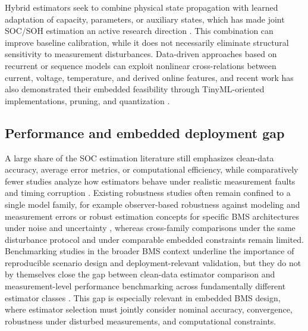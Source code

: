 \documentclass[review]{elsarticle}
\begin{document}
Hybrid estimators seek to combine physical state propagation with learned adaptation of capacity, parameters, or auxiliary states, which has made joint SOC/SOH estimation an active research direction \cite{gaoCoEstimationStateofChargeStateof2022,shenAlternativeCombinedCoestimation2022,wangFusionEstimationLithiumion2022}. This combination can improve baseline calibration, while it does not necessarily eliminate structural sensitivity to measurement disturbances. Data-driven approaches based on recurrent or sequence models can exploit nonlinear cross-relations between current, voltage, temperature, and derived online features, and recent work has also demonstrated their embedded feasibility through TinyML-oriented implementations, pruning, and quantization \cite{mondalEstimatingStateofChargeLithiumIon2024,Embedded_AI_only_SOC_mobile,giazitzisCaseStudyTiny2024,mazziStateChargeEstimation2022,yaoSmarterBatteryManagement2025b}.

\subsection{Performance and embedded deployment gap}
A large share of the SOC estimation literature still emphasizes clean-data accuracy, average error metrics, or computational efficiency, while comparatively fewer studies analyze how estimators behave under realistic measurement faults and timing corruption \cite{shrivastavaReviewTechnologicalAdvancement2023,Embedded_AI_only_SOC_mobile,giazitzisCaseStudyTiny2024,mazziStateChargeEstimation2022}. Existing robustness studies often remain confined to a single model family, for example observer-based robustness against modeling and measurement errors \cite{liRobustnessSOCEstimation2015} or robust estimation concepts for specific BMS architectures under noise and uncertainty \cite{naseriReliableWirelessBMS2025}, whereas cross-family comparisons under the same disturbance protocol and under comparable embedded constraints remain limited. Benchmarking studies in the broader BMS context underline the importance of reproducible scenario design and deployment-relevant validation, but they do not by themselves close the gap between clean-data estimator comparison and measurement-level performance benchmarking across fundamentally different estimator classes \cite{bergerBenchmarkingBatteryManagement2024}. This gap is especially relevant in embedded BMS design, where estimator selection must jointly consider nominal accuracy, convergence, robustness under disturbed measurements, and computational constraints.
\end{document}
